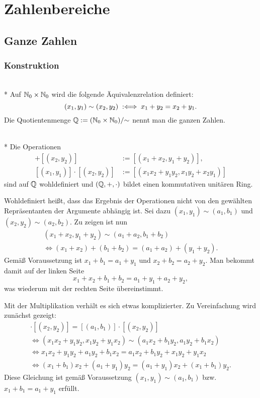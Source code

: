 
\chapter{Zahlenbereiche}

\section{Ganze Zahlen}

\subsection{Konstruktion}

\begin{Definition}\mbox{}\\*
Auf $\mathbb N_0\times\mathbb N_0$ wird die folgende Äquivalenzrelation definiert:
\[(x_1,y_1)\sim (x_2,y_2) \;:\Longleftrightarrow\; x_1+y_2 = x_2+y_1.\]
Die Quotientenmenge $\mathbb Q := (\mathbb N_0\times\mathbb N_0)/{\sim}$ nennt man
die ganzen Zahlen.
\end{Definition}

\begin{Satz}\mbox{}\\*
Die Operationen
\begin{align*}
[(x_1,y_1)]+[(x_2,y_2)] &:= [(x_1+x_2,y_1+y_2)],\\
[(x_1,y_1)]\cdot [(x_2,y_2)] &:= [(x_1x_2+y_1y_2,x_1y_2+x_2y_1)]
\end{align*}
sind auf $\mathbb Q$ wohldefiniert und $(\mathbb Q,+,\cdot)$ bildet einen
kommutativen unitären Ring.
\end{Satz}
 Wohldefiniert heißt, dass das Ergebnis der Operationen
nicht von den gewählten Repräsentanten der Argumente abhängig ist.
Sei dazu $(x_1,y_1)\sim(a_1,b_1)$ und
$(x_2,y_2)\sim (a_2,b_2)$. Zu zeigen ist nun
\begin{gather*}
(x_1+x_2,y_1+y_2)\sim (a_1+a_2,b_1+b_2)\\
\iff (x_1+x_2)+(b_1+b_2) = (a_1+a_2)+(y_1+y_2).
\end{gather*}
Gemäß Voraussetzung ist $x_1+b_1=a_1+y_1$ und $x_2+b_2=a_2+y_2$.
Man bekommt damit auf der linken Seite
\[x_1+x_2+b_1+b_2 = a_1+y_1+a_2+y_2,\]
was wiederum mit der rechten Seite übereinstimmt.

Mit der Multiplikation verhält es sich etwas komplizierter.
Zu Vereinfachung wird zunächst gezeigt:
\begin{gather*}
[(x_1,y_1)]\cdot [(x_2,y_2)] = [(a_1,b_1)]\cdot [(x_2,y_2)]\\
\iff (x_1x_2+y_1y_2,x_1y_2+y_1x_2)\sim (a_1x_2+b_1y_2,a_1y_2+b_1x_2)\\
\iff x_1x_2+y_1y_2 + a_1y_2+b_1x_2 = a_1x_2+b_1y_2 + x_1y_2+y_1x_2\\
\iff (x_1+b_1)x_2 + (a_1+y_1)y_2 = (a_1+y_1)x_2 + (x_1+b_1)y_2.
\end{gather*}
Diese Gleichung ist gemäß Voraussetzung $(x_1,y_1)\sim (a_1,b_1)$
bzw. $x_1+b_1=a_1+y_1$ erfüllt.

